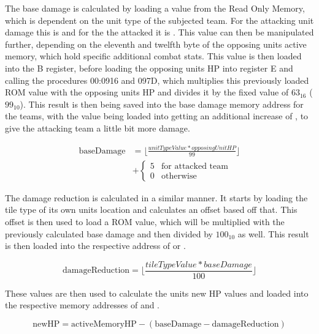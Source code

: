 The base damage is calculated by loading a value from the Read Only Memory, which is dependent on the unit type of the subjected team. For the attacking unit damage this is  and for the the attacked it is .
This value can then be manipulated further, depending on the eleventh and twelfth byte of the opposing units active memory, which hold specific additional combat stats.
This value is then loaded into the B register, before loading the opposing units HP into register E and calling the procedures 00:0916 and 097D, which multiplies this previously loaded ROM value with the opposing units HP and divides it by the fixed value of $63_{16}$ ($99_{10}$).
This result is then being saved into the base damage memory address for the teams, with the value being loaded into  getting an additional increase of , to give the attacking team a little bit more damage.

\begin{equation}
	\begin{aligned}
	\text{baseDamage} &=\lfloor\frac{unitTypeValue * opposingUnitHP}{99}\rfloor \\
	 &+ \begin{cases} 5 & \text{for attacked team} \\ 0 & \text{otherwise} \end{cases}
	\end{aligned}
\end{equation}

The damage reduction is calculated in a similar manner. It starts by loading the tile type of its own units location and calculates an offset based off that. This offset is then used to load a ROM value, which will be multiplied with the previously calculated base damage and then divided by $100_{10}$ as well. This result is then loaded into the respective address of  or .

\begin{equation}
		\text{damageReduction} =\lfloor\frac{tileTypeValue * baseDamage}{100}\rfloor
\end{equation}

These values are then used to calculate the units new HP values and loaded into the respective memory addresses of  and .

\begin{equation}
	\text{newHP} = \text{activeMemoryHP} - (\text{baseDamage} -\text{damageReduction})
\end{equation}

